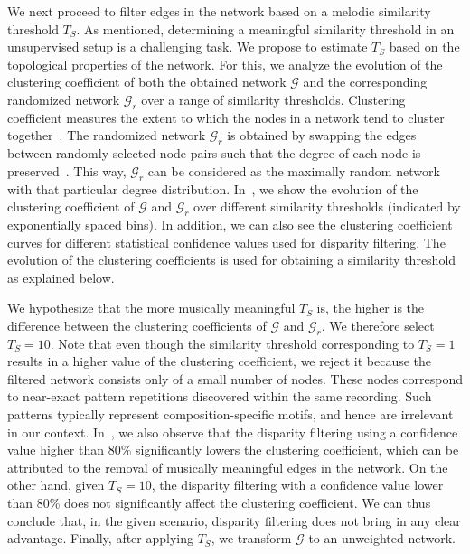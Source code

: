 {We next proceed to filter edges in the network based on a melodic similarity threshold $T_S$. As mentioned, determining a meaningful similarity threshold in an unsupervised setup is a challenging task. We propose to estimate $T_S$ based on the topological properties of the network. For this, we analyze the evolution of the clustering coefficient of both the obtained network $\mathcal{G}$ and the corresponding randomized network $\mathcal{G}_r$ over a range of similarity thresholds. Clustering coefficient measures the extent to which the nodes in a network tend to cluster together~\citep{newman2003structure}. The randomized network $\mathcal{G}_r$ is obtained by swapping the edges between randomly selected node pairs such that the degree of each node is preserved~\citep{maslov2002specificity}. This way, $\mathcal{G}_r$ can be considered as the maximally random network with that particular degree distribution. In~, we show the evolution of the clustering coefficient of $\mathcal{G}$ and $\mathcal{G}_r$ over different similarity thresholds (indicated by exponentially spaced bins). In addition, we can also see the clustering coefficient curves for different statistical confidence values used for disparity filtering. The evolution of the clustering coefficients is used for obtaining a similarity threshold as explained below.

We hypothesize that the more musically meaningful $T_S$ is, the higher is the difference between the clustering coefficients of $\mathcal{G}$ and $\mathcal{G}_r$. We therefore select $T_S=10$. Note that even though the similarity threshold corresponding to $T_S=1$ results in a higher value of the clustering coefficient, we reject it because the filtered network consists only of a small number of nodes. These nodes correspond to near-exact pattern repetitions discovered within the same recording. Such patterns typically represent composition-specific motifs, and hence are irrelevant in our context. In~, we also observe that the disparity filtering using a confidence value higher than 80\% significantly lowers the clustering coefficient, which can be attributed to the removal of musically meaningful edges in the network. On the other hand, given $T_S=10$, the disparity filtering with a confidence value lower than 80\% does not significantly affect the clustering coefficient. We can thus conclude that, in the given scenario, disparity filtering does not bring in any clear advantage. Finally, after applying $T_S$, we transform $\mathcal{G}$ to an unweighted network. 


}
